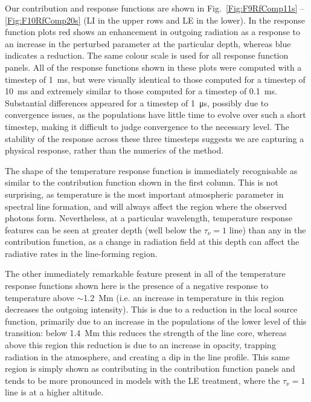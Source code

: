 Our contribution and response functions are shown in Fig.~\ref{Fig:F9RfComp11s} -- \ref{Fig:F10RfComp20s} (LI in the upper rows and LE in the lower).
In the response function plots red shows an enhancement in outgoing radiation as a response to an increase in the perturbed parameter at the particular depth, whereas blue indicates a reduction.
The same colour scale is used for all response function panels.
All of the response functions shown in these plots were computed with a timestep of \SI{1}{\milli\second}, but were visually identical to those computed for a timestep of \SI{10}{\milli\second} and extremely similar to those computed for a timestep of \SI{0.1}{\milli\second}.
Substantial differences appeared for a timestep of \SI{1}{\micro\s}, possibly due to convergence issues, as the populations have little time to evolve over such a short timestep, making it difficult to judge convergence to the necessary level.
The stability of the response across these three timesteps suggests we are capturing a physical response, rather than the numerics of the method.

The shape of the temperature response function is immediately recognisable as similar to the contribution function shown in the first column.
This is not surprising, as temperature is the most important atmospheric parameter in spectral line formation, and will always affect the region where the observed photons form.
Nevertheless, at a particular wavelength, temperature response features can be seen at greater depth (well below the $\tau_\nu=1$ line) than any in the contribution function, as a change in radiation field at this depth can affect the radiative rates in the line-forming region.

The other immediately remarkable feature present in all of the temperature response functions shown here is the presence of a negative response to temperature above $\sim$\SI{1.2}{\mega\metre} (i.e. an increase in temperature in this region decreases the outgoing intensity).
This is due to a reduction in the local source function, primarily due to an increase in the populations of the lower level of this transition: below \SI{1.4}{\mega\m} this reduces the strength of the line core, whereas above this region this reduction is due to an increase in opacity, trapping radiation in the atmosphere, and creating a dip in the line profile.
This same region is simply shown as contributing in the contribution function panels and tends to be more pronounced in models with the LE treatment, where the $\tau_\nu=1$ line is at a higher altitude.

